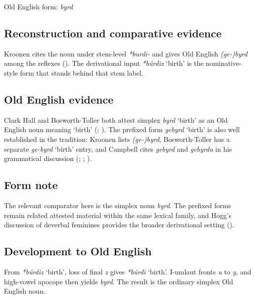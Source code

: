 \documentclass[
  british,
  a4paper,
  openany]{book}
\providecommand{\Recon}[1]{\emph{*#1}}
{\catcode`→=\active \global\def→{\ensuremath{\rightarrow}}}
\providecommand{\Recon}[1]{\emph{*#1}}
{\catcode`→=\active \global\def→{\ensuremath{\rightarrow}}}
\begin{document}
Old English form: \emph{byrd}

\subsection{Reconstruction and comparative
evidence}\label{reconstruction-and-comparative-evidence-5}

Kroonen cites the noun under stem-level \emph{*burdi-} and gives Old
English \emph{(ge-)byrd} among the reflexes
(). The derivational input
\Recon{búrdiz} `birth' is the nominative-style form that stands behind
that stem label.

\subsection{Old English evidence}\label{old-english-evidence-5}

Clark Hall and Bosworth-Toller both attest simplex {\emph{byrd}} `birth'
as an Old English noun meaning `birth'
(;
). The
prefixed form \emph{gebyrd} `birth' is also well established in the
tradition: Kroonen lists \emph{(ge-)byrd}, Bosworth-Toller has a
separate \emph{ge-byrd} `birth' entry, and Campbell cites \emph{gebyrd}
and \emph{gebyrdu} in his grammatical discussion
(;
;
).

\subsection{Form note}\label{form-note}

The relevant comparator here is the simplex noun \emph{byrd}. The
prefixed forms remain related attested material within the same lexical
family, and Hogg's discussion of deverbal feminines provides the broader
derivational setting ().

\subsection{Development to Old
English}\label{development-to-old-english-5}

From \Recon{búrdiz} `birth', loss of final \emph{z} gives \Recon{búrdi}
`birth'. I-umlaut fronts \emph{u} to \emph{y}, and high-vowel apocope
then yields \emph{byrd}. The result is the ordinary simplex Old English
noun.
\end{document}
